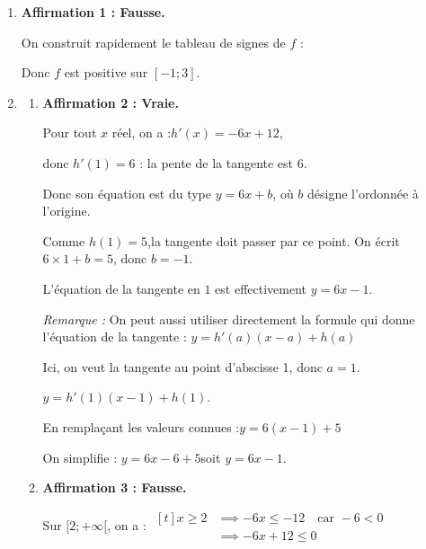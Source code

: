\begin{enumerate}[itemsep = 5mm]
		\item \textbf{Affirmation 1 : Fausse.}

		On construit rapidement le tableau de signes de $f$ :
		\begin{center}
		\end{center}
		Donc $f$ est positive sur \mbox{$[-1;3]$}.

		\item \begin{enumerate}
			\item \textbf{Affirmation 2 : Vraie.}

			Pour tout $x$ réel, on a :\quad \mbox{$h'(x) = -6x+12$},

			donc \quad \mbox{$h'(1) = 6$} : \quad la pente  de la tangente est $6$.

			Donc son équation est du type \quad \mbox{$y = 6x+b$}, \quad où $b$ désigne l'ordonnée à l'origine.

			Comme \quad \mbox{$h(1) = 5$},\quad la tangente doit passer par ce point. On écrit \mbox{$6\times1+b = 5$}, donc \mbox{$b = -1$}.

			L'équation de la tangente en $1$ est effectivement \mbox{$y = 6x-1$}.

			\emph{Remarque :} On peut aussi utiliser directement la formule qui donne l'équation de la tangente : \quad $y = h'(a)(x - a) + h(a)$

			Ici, on veut la tangente au point d'abscisse 1, donc $a = 1$.

			$y = h'(1)(x - 1) + h(1)$.

			En remplaçant les valeurs connues :\quad $y = 6(x - 1) + 5$

			On simplifie : \quad $y = 6x - 6 + 5$\quad soit \quad $y = 6x - 1$.

			\item \textbf{Affirmation 3 : Fausse.}

			Sur $[2 ; +\infty[$, on a : \quad $\begin{aligned}[t]
				x \geqslant 2
				&\implies -6x \leqslant -12 \quad \text{car } -6 < 0\\
				&\implies -6x + 12 \leqslant 0
			\end{aligned}$


\end{enumerate}
\end{enumerate}
